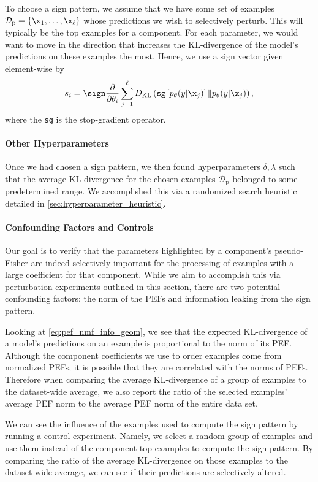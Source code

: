 \documentclass[dvipsnames]{article}
\begin{document}
To choose a sign pattern, we assume that we have some set of examples $\mathcal D_\mathrm{p} = \{\x_1,\dotsc,\x_\ell\}$ whose predictions we wish to selectively perturb.
This will typically be the top examples for a component.
For each parameter, we would want to move in the direction that increases the KL-divergence of the model's predictions on these examples the most.
Hence, we use a sign vector given element-wise by
\begin{equation}
    s_i = \sign \frac{\partial}{\partial \theta_i}\sum_{j=1}^\ell D_\mathrm{KL}\left(\operatorname{\text{\texttt{sg}}}\left[p_\theta(y|\x_j)\right] \| p_{\theta}(y|\x_j)\right) ,
\end{equation}
where the \texttt{sg} is the stop-gradient operator.

\paragraph{Other Hyperparameters}
Once we had chosen a sign pattern, we then found hyperparameters $\delta,\lambda$ such that the average KL-divergence for the chosen examples $\mathcal D_\mathrm{p}$ belonged to some predetermined range.
We accomplished this via a randomized search heuristic detailed in \cref{sec:hyperparameter_heuristic}.

\paragraph{Confounding Factors and Controls}
Our goal is to verify that the parameters highlighted by a component's pseudo-Fisher are indeed selectively important for the processing of examples with a large coefficient for that component.
While we aim to accomplish this via perturbation experiments outlined in this section, there are two potential confounding factors: the norm of the PEFs and information leaking from the sign pattern.

Looking at \eqref{eq:pef_nmf_info_geom}, we see that the expected KL-divergence of a model's predictions on an example is proportional to the norm of its PEF.
Although the component coefficients we use to order examples come from normalized PEFs, it is possible that they are correlated with the norms of PEFs.
Therefore when comparing the average KL-divergence of a group of examples to the dataset-wide average, we also report the ratio of the selected examples' average PEF norm to the average PEF norm of the entire data set.

We can see the influence of the examples used to compute the sign pattern by running a control experiment.
Namely, we select a random group of examples and use them instead of the component top examples to compute the sign pattern.
By comparing the ratio of the average KL-divergence on those examples to the dataset-wide average, we can see if their predictions are selectively altered.
\end{document}
